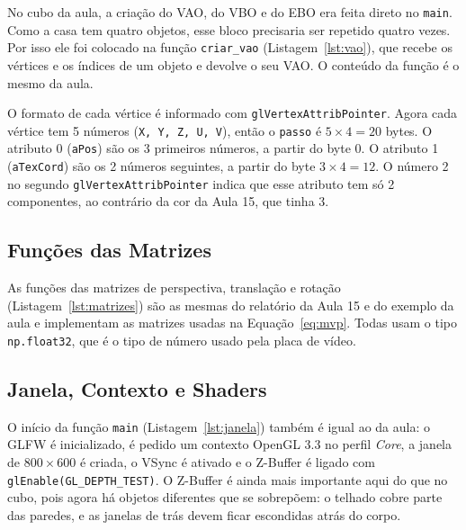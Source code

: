 \documentclass{article}
\begin{document}
No cubo da aula, a criação do VAO, do VBO e do EBO era feita direto no \texttt{main}. Como a casa tem quatro objetos, esse bloco precisaria ser repetido quatro vezes. Por isso ele foi colocado na função \texttt{criar\_vao} (Listagem~\ref{lst:vao}), que recebe os vértices e os índices de um objeto e devolve o seu VAO. O conteúdo da função é o mesmo da aula.

O formato de cada vértice é informado com \texttt{glVertexAttribPointer}. Agora cada vértice tem 5 números (\texttt{X, Y, Z, U, V}), então o \texttt{passo} é $5 \times 4 = 20$ bytes. O atributo 0 (\texttt{aPos}) são os 3 primeiros números, a partir do byte 0. O atributo 1 (\texttt{aTexCord}) são os 2 números seguintes, a partir do byte $3 \times 4 = 12$. O número 2 no segundo \texttt{glVertexAttribPointer} indica que esse atributo tem só 2 componentes, ao contrário da cor da Aula 15, que tinha 3.



\subsection{Funções das Matrizes}

As funções das matrizes de perspectiva, translação e rotação (Listagem~\ref{lst:matrizes}) são as mesmas do relatório da Aula 15 e do exemplo da aula e implementam as matrizes usadas na Equação~\ref{eq:mvp}. Todas usam o tipo \texttt{np.float32}, que é o tipo de número usado pela placa de vídeo.



\subsection{Janela, Contexto e Shaders}

O início da função \texttt{main} (Listagem~\ref{lst:janela}) também é igual ao da aula: o GLFW é inicializado, é pedido um contexto OpenGL 3.3 no perfil \textit{Core}, a janela de $800\times600$ é criada, o VSync é ativado e o Z-Buffer é ligado com \texttt{glEnable(GL\_DEPTH\_TEST)}. O Z-Buffer é ainda mais importante aqui do que no cubo, pois agora há objetos diferentes que se sobrepõem: o telhado cobre parte das paredes, e as janelas de trás devem ficar escondidas atrás do corpo.
\end{document}
